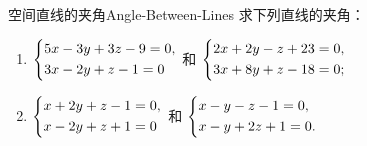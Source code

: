\begin{problem}{空间直线的夹角}{Angle-Between-Lines}
    求下列直线的夹角：
    \begin{enumerate}
        \item $\begin{dcases} 5x - 3y + 3z - 9 = 0, \\ 3x - 2y + z - 1 = 0 \end{dcases}$ 和 $\begin{dcases} 2x + 2y - z + 23 = 0, \\ 3x + 8y + z - 18 = 0; \end{dcases}$
        \item $\begin{dcases} x + 2y + z - 1 = 0, \\ x - 2y + z + 1 = 0 \end{dcases}$ 和 $\begin{dcases} x - y - z - 1 = 0, \\ x - y + 2z + 1 = 0. \end{dcases}$
    \end{enumerate}
\end{problem}

